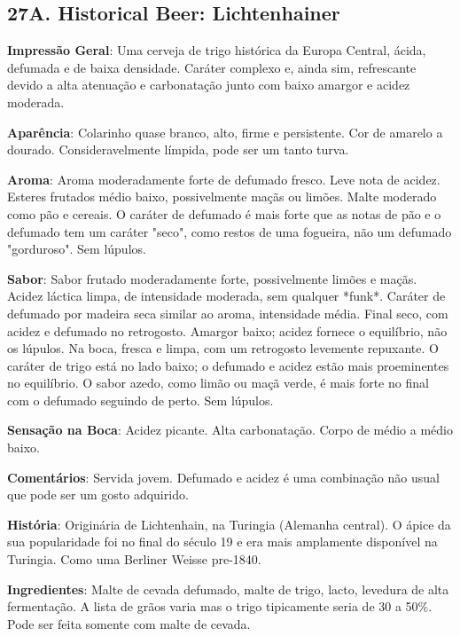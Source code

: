 \subsection*{27A. Historical Beer: Lichtenhainer}

\textbf{Impressão Geral}: Uma cerveja de trigo histórica da Europa Central, ácida, defumada e de baixa densidade. Caráter complexo e, ainda sim, refrescante devido a alta atenuação e carbonatação junto com baixo amargor e acidez moderada.

\textbf{Aparência}: Colarinho quase branco, alto, firme e persistente. Cor de amarelo a dourado. Consideravelmente límpida, pode ser um tanto turva.

\textbf{Aroma}: Aroma moderadamente forte de defumado fresco. Leve nota de acidez. Esteres frutados médio baixo, possivelmente maçãs ou limões. Malte moderado como pão e cereais. O caráter de defumado é mais forte que as notas de pão e o defumado tem um caráter "seco", como restos de uma fogueira, não um defumado "gorduroso". Sem lúpulos.

\textbf{Sabor}: Sabor frutado moderadamente forte, possivelmente limões e maçãs. Acidez láctica limpa, de intensidade moderada, sem qualquer *funk*. Caráter de defumado por madeira seca similar ao aroma, intensidade média. Final seco, com acidez e defumado no retrogosto. Amargor baixo; acidez fornece o equilíbrio, não os lúpulos. Na boca, fresca e limpa, com um retrogosto levemente repuxante. O caráter de trigo está no lado baixo; o defumado e acidez estão mais proeminentes no equilíbrio. O sabor azedo, como limão ou maçã verde, é mais forte no final com o defumado seguindo de perto. Sem lúpulos.

\textbf{Sensação na Boca}: Acidez picante. Alta carbonatação. Corpo de médio a médio baixo.

\textbf{Comentários}: Servida jovem. Defumado e acidez é uma combinação não usual que pode ser um gosto adquirido.

\textbf{História}: Originária de Lichtenhain, na Turingia (Alemanha central). O ápice da sua popularidade foi no final do século 19 e era mais amplamente disponível na Turingia. Como uma Berliner Weisse pre-1840.

\textbf{Ingredientes}: Malte de cevada defumado, malte de trigo, lacto, levedura de alta fermentação. A lista de grãos varia mas o trigo tipicamente seria de 30 a 50\%. Pode ser feita somente com malte de cevada.

